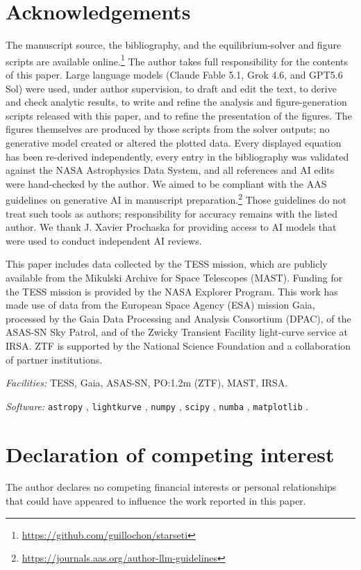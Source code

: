 \documentclass[final,5p]{elsarticle}
\begin{document}
\section*{Acknowledgements}
The manuscript source, the bibliography, and the equilibrium-solver and figure scripts are available online.\footnote{\url{https://github.com/guillochon/starseti}} The author takes full responsibility for the contents of this paper. Large language models (Claude Fable 5.1, Grok 4.6, and GPT5.6 Sol) were used, under author supervision, to draft and edit the text, to derive and check analytic results, to write and refine the analysis and figure-generation scripts released with this paper, and to refine the presentation of the figures. The figures themselves are produced by those scripts from the solver outputs; no generative model created or altered the plotted data. Every displayed equation has been re-derived independently, every entry in the bibliography was validated against the NASA Astrophysics Data System, and all references and AI edits were hand-checked by the author. We aimed to be compliant with the AAS guidelines on generative AI in manuscript preparation.\footnote{\url{https://journals.aas.org/author-llm-guidelines}} Those guidelines do not treat such tools as authors; responsibility for accuracy remains with the listed author. We thank J. Xavier Prochaska for providing access to AI models that were used to conduct independent AI reviews.

This paper includes data collected by the TESS mission, which are publicly available from the Mikulski Archive for Space Telescopes (MAST). Funding for the TESS mission is provided by the NASA Explorer Program. This work has made use of data from the European Space Agency (ESA) mission Gaia, processed by the Gaia Data Processing and Analysis Consortium (DPAC), of the ASAS-SN Sky Patrol, and of the Zwicky Transient Facility light-curve service at IRSA. ZTF is supported by the National Science Foundation and a collaboration of partner institutions.

\emph{Facilities:} TESS, Gaia, ASAS-SN, PO:1.2m (ZTF), MAST, IRSA.

\emph{Software:} \texttt{astropy} \citep{Astropy2022}, \texttt{lightkurve} \citep{Lightkurve2018}, \texttt{numpy} \citep{Harris2020}, \texttt{scipy} \citep{Virtanen2020}, \texttt{numba} \citep{Lam2015numba}, \texttt{matplotlib} \citep{Hunter2007}.

\section*{Declaration of competing interest}
The author declares no competing financial interests or personal relationships that could have appeared to influence the work reported in this paper.
\end{document}
